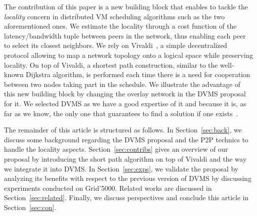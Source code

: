 The contribution of this paper is a new building block that enables to tackle the
\emph{locality} concern in distributed VM scheduling algorithms such as the two
aforementioned ones.
We estimate the locality through a cost function of the latency/bandwidth tuple between
peers in the network, thus enabling each peer to select its closest neighbors. We rely on
Vivaldi~\cite{dabek:2001:sigcomm04}, a simple decentralized protocol allowing to map a
network topology onto a logical space while preserving locality. On top of Vivaldi, a shortest path
construction, similar to the well-known Dijkstra algorithm, is performed each time there is
a need for cooperation between two nodes taking part in the schedule. We illustrate the
advantage of this new building block by changing the overlay network in the DVMS
proposal~\cite{quesnel:cpe2012} for it. We selected DVMS as we have a good expertise of it and
because it is, as far as we know, the only one that guarantees to find a solution if one exists~\cite{quesnel:ispa2013}.
                                                   
The remainder of this article is structured as follows. In Section~\ref{sec:back}, we
discuss some background regarding the DVMS proposal and the P2P technics to handle
the locality aspects. Section~\ref{sec:contribs} gives an overview of our proposal by
introducing the short path algorithm on top of Vivaldi and the way we integrate it into
DVMS. In Section~\ref{sec:exps}, we validate the proposal by analyzing its benefits with
respect to the previous version of DVMS by discussing experiments conducted on
Grid'5000. Related works are discussed in Section~\ref{sec:related}. Finally, we discuss
perspectives and conclude this article in Section~\ref{sec:con}.


